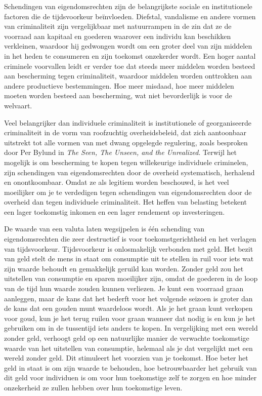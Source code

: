 Schendingen van eigendomsrechten zijn de belangrijkste sociale en institutionele factoren die de tijdsvoorkeur beïnvloeden. Diefstal, vandalisme en andere vormen van criminaliteit zijn vergelijkbaar met natuurrampen in de zin dat ze de voorraad aan kapitaal en goederen waarover een individu kan beschikken verkleinen, waardoor hij gedwongen wordt om een groter deel van zijn middelen in het heden te consumeren en zijn toekomst onzekerder wordt. Een hoger aantal criminele voorvallen leidt er verder toe dat steeds meer middelen worden besteed aan bescherming tegen criminaliteit, waardoor middelen worden onttrokken aan andere productieve bestemmingen. Hoe meer misdaad, hoe meer middelen moeten worden besteed aan bescherming, wat niet bevorderlijk is voor de welvaart.

Veel belangrijker dan individuele criminaliteit is institutionele of georganiseerde criminaliteit in de vorm van roofzuchtig overheidsbeleid, dat zich aantoonbaar uitstrekt tot alle vormen van met dwang opgelegde regulering, zoals besproken door Per Bylund in \emph{The Seen, The Unseen, and the Unrealized}.\autocite{149} Terwijl het mogelijk is om bescherming te kopen tegen willekeurige individuele criminelen, zijn schendingen van eigendomsrechten door de overheid systematisch, herhalend en onontkoombaar. Omdat ze als legitiem worden beschouwd, is het veel moeilijker om je te verdedigen tegen schendingen van eigendomsrechten door de overheid dan tegen individuele criminaliteit. Het heffen van belasting betekent een lager toekomstig inkomen en een lager rendement op investeringen.

De waarde van een valuta laten wegsijpelen is één schending van eigendomsrechten die zeer destructief is voor toekomstgerichtheid en het verlagen van tijdsvoorkeur. Tijdsvoorkeur is onlosmakelijk verbonden met geld. Het bezit van geld stelt de mens in staat om consumptie uit te stellen in ruil voor iets wat zijn waarde behoudt en gemakkelijk geruild kan worden. Zonder geld zou het uitstellen van consumptie en sparen moeilijker zijn, omdat de goederen in de loop van de tijd hun waarde zouden kunnen verliezen. Je kunt een voorraad graan aanleggen, maar de kans dat het bederft voor het volgende seizoen is groter dan de kans dat een gouden munt waardeloos wordt. Als je het graan kunt verkopen voor goud, kun je het terug ruilen voor graan wanneer dat nodig is en kun je het gebruiken om in de tussentijd iets anders te kopen. In vergelijking met een wereld zonder geld, verhoogt geld op een natuurlijke manier de verwachte toekomstige waarde van het uitstellen van consumptie, helemaal als je dat vergelijkt met een wereld zonder geld. Dit stimuleert het voorzien van je toekomst. Hoe beter het geld in staat is om zijn waarde te behouden, hoe betrouwbaarder het gebruik van dit geld voor individuen is om  voor hun toekomstige zelf te zorgen en hoe minder onzekerheid ze zullen hebben over hun toekomstige leven.

